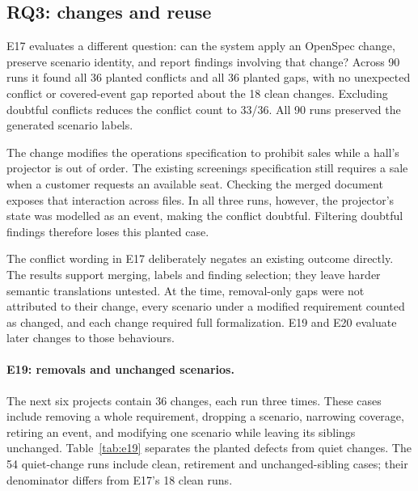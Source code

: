 \subsection{RQ3: changes and reuse}\label{sec:rq3}

E17 evaluates a different question: can the system apply an OpenSpec change,
preserve scenario identity, and report findings involving that change? Across
90 runs it found all 36 planted conflicts and all 36 planted gaps, with no
unexpected conflict or covered-event gap reported about the 18 clean changes.
Excluding doubtful conflicts reduces the conflict count to 33/36. All 90 runs
preserved the generated scenario labels.

The change modifies the operations specification to prohibit sales while a
hall's projector is out of order. The existing screenings specification still
requires a sale when a customer requests an available seat. Checking the merged
document exposes that interaction across files. In all three runs, however,
the projector's state was modelled as an event, making the conflict doubtful.
Filtering doubtful findings therefore loses this planted case.

The conflict wording in E17 deliberately negates an existing outcome directly.
The results support merging, labels and finding selection; they leave harder
semantic translations untested. At the time, removal-only gaps were not attributed to their
change, every scenario under a modified requirement counted as changed, and each
change required full formalization. E19 and E20 evaluate later changes to those behaviours.

\paragraph{E19: removals and unchanged scenarios.}
The next six projects contain 36 changes, each run three times. These cases include removing a whole requirement, dropping a scenario, narrowing coverage, retiring an event, and modifying one scenario while leaving its siblings unchanged. Table~\ref{tab:e19} separates the planted defects from quiet changes. The 54 quiet-change runs include clean, retirement and unchanged-sibling cases; their denominator differs from E17's 18 clean runs.

